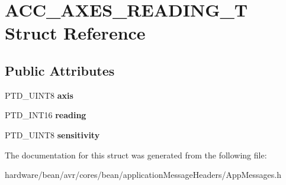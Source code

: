 \hypertarget{struct_a_c_c___a_x_e_s___r_e_a_d_i_n_g___t}{}\section{A\+C\+C\+\_\+\+A\+X\+E\+S\+\_\+\+R\+E\+A\+D\+I\+N\+G\+\_\+\+T Struct Reference}
\label{struct_a_c_c___a_x_e_s___r_e_a_d_i_n_g___t}
\subsection*{Public Attributes}
\begin{DoxyCompactItemize}
\item 
\hypertarget{struct_a_c_c___a_x_e_s___r_e_a_d_i_n_g___t_ae69a9b056f681d3f3822fa9abd829334}{}P\+T\+D\+\_\+\+U\+I\+N\+T8 {\bfseries axis}\label{struct_a_c_c___a_x_e_s___r_e_a_d_i_n_g___t_ae69a9b056f681d3f3822fa9abd829334}

\item 
\hypertarget{struct_a_c_c___a_x_e_s___r_e_a_d_i_n_g___t_a66d4a402c79f1769dd23c6e91600862e}{}P\+T\+D\+\_\+\+I\+N\+T16 {\bfseries reading}\label{struct_a_c_c___a_x_e_s___r_e_a_d_i_n_g___t_a66d4a402c79f1769dd23c6e91600862e}

\item 
\hypertarget{struct_a_c_c___a_x_e_s___r_e_a_d_i_n_g___t_a726d2fb3bec4083a4c3abfeaae5f4f11}{}P\+T\+D\+\_\+\+U\+I\+N\+T8 {\bfseries sensitivity}\label{struct_a_c_c___a_x_e_s___r_e_a_d_i_n_g___t_a726d2fb3bec4083a4c3abfeaae5f4f11}

\end{DoxyCompactItemize}


The documentation for this struct was generated from the following file\+:\begin{DoxyCompactItemize}
\item 
hardware/bean/avr/cores/bean/application\+Message\+Headers/App\+Messages.\+h\end{DoxyCompactItemize}

